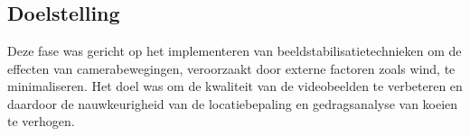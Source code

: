 \chapter{}%
\label{ch:beeldstabilisatie}

\section{Doelstelling}
Deze fase was gericht op het implementeren van beeldstabilisatietechnieken om de effecten van camerabewegingen, veroorzaakt door externe factoren zoals wind, te minimaliseren. Het doel was om de kwaliteit van de videobeelden te verbeteren en daardoor de nauwkeurigheid van de locatiebepaling en gedragsanalyse van koeien te verhogen.

